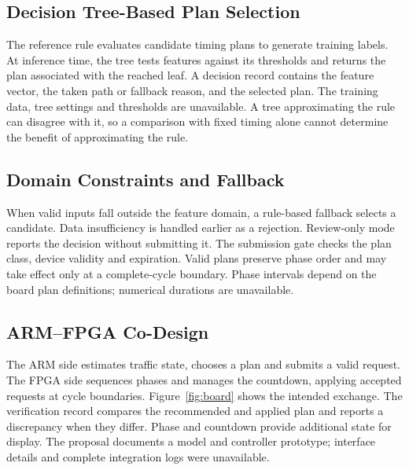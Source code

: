 \subsection{Decision Tree-Based Plan Selection}
The reference rule evaluates candidate timing plans to generate training labels. At inference time, the tree tests features against its thresholds and returns the plan associated with the reached leaf. A decision record contains the feature vector, the taken path or fallback reason, and the selected plan. The training data, tree settings and thresholds are unavailable. A tree approximating the rule can disagree with it, so a comparison with fixed timing alone cannot determine the benefit of approximating the rule.

\subsection{Domain Constraints and Fallback}
When valid inputs fall outside the feature domain, a rule-based fallback selects a candidate. Data insufficiency is handled earlier as a rejection. Review-only mode reports the decision without submitting it. The submission gate checks the plan class, device validity and expiration. Valid plans preserve phase order and may take effect only at a complete-cycle boundary. Phase intervals depend on the board plan definitions; numerical durations are unavailable.

\subsection{ARM--FPGA Co-Design}
The ARM side estimates traffic state, chooses a plan and submits a valid request. The FPGA side sequences phases and manages the countdown, applying accepted requests at cycle boundaries. Figure~\ref{fig:board} shows the intended exchange. The verification record compares the recommended and applied plan and reports a discrepancy when they differ. Phase and countdown provide additional state for display. The proposal documents a model and controller prototype; interface details and complete integration logs were unavailable.



